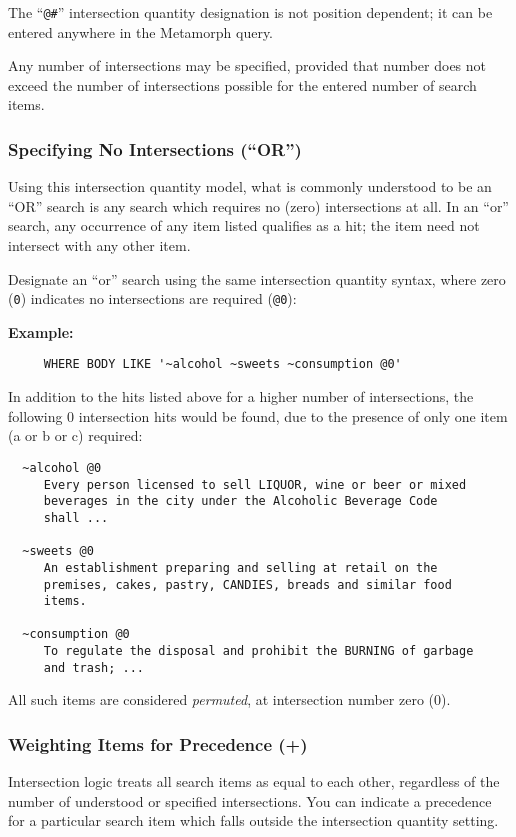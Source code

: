 The ``\verb`@#`'' intersection quantity designation is not position
dependent; it can be entered anywhere in the Metamorph query.

Any number of intersections may be specified, provided that number
does not exceed the number of intersections possible for the entered
number of search items.

\subsubsection{Specifying No Intersections (``OR'')}

Using this intersection quantity model, what is commonly understood to
be an ``OR'' search is any search which requires no (zero)
intersections at all.  In an ``or'' search, any occurrence of any item
listed qualifies as a hit; the item need not intersect with any other
item.

Designate an ``or'' search using the same intersection quantity
syntax, where zero (\verb`0`) indicates no intersections are required
(\verb`@0`):

{\bf Example:}
\begin{verbatim}
     WHERE BODY LIKE '~alcohol ~sweets ~consumption @0'
\end{verbatim}

In addition to the hits listed above for a higher number of
intersections, the following 0 intersection hits would be found, due
to the presence of only one item (a or b or c) required:

\begin{verbatim}
  ~alcohol @0
     Every person licensed to sell LIQUOR, wine or beer or mixed
     beverages in the city under the Alcoholic Beverage Code
     shall ...

  ~sweets @0
     An establishment preparing and selling at retail on the
     premises, cakes, pastry, CANDIES, breads and similar food
     items.

  ~consumption @0
     To regulate the disposal and prohibit the BURNING of garbage
     and trash; ...
\end{verbatim}

All such items are considered {\em permuted}, at intersection number
zero (0).

\subsubsection{Weighting Items for Precedence (+)}

Intersection logic treats all search items as equal to each other,
regardless of the number of understood or specified intersections.
You can indicate a precedence for a particular search item which falls
outside the intersection quantity setting.

